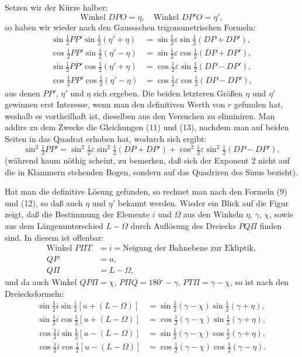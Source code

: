 \documentclass[12pt,a4paper]{article}
\newcommand{\degree}{\ensuremath{^\circ}}
\theoremstyle{plain}
\theoremstyle{definition}
\theoremstyle{remark}
\begin{document}
Setzen wir der Kürze halber:
\[
\text{Winkel }DPO = \eta,\quad \text{Winkel }DP'O = \eta',
\]
so haben wir wieder nach den Gaussschen trigonometrischen Formeln:
\begin{align}
\sin\tfrac{1}{2}PP' \sin\tfrac{1}{2}(\eta' + \eta) &= \sin\tfrac{1}{2}\varepsilon \sin\tfrac{1}{2}(DP + DP'), \tag{11}\\
\cos\tfrac{1}{2}PP' \sin\tfrac{1}{2}(\eta' - \eta) &= \sin\tfrac{1}{2}\varepsilon \cos\tfrac{1}{2}(DP + DP'), \tag{12}\\
\sin\tfrac{1}{2}PP' \cos\tfrac{1}{2}(\eta' + \eta) &= \cos\tfrac{1}{2}\varepsilon \sin\tfrac{1}{2}(DP - DP'), \tag{13}\\
\cos\tfrac{1}{2}PP' \cos\tfrac{1}{2}(\eta' - \eta) &= \cos\tfrac{1}{2}\varepsilon \cos\tfrac{1}{2}(DP - DP'), \tag{14}
\end{align}
aus denen $PP'$, $\eta'$ und $\eta$ sich ergeben. Die beiden letzteren Größen $\eta$ und $\eta'$ gewinnen erst Interesse, wenn man den definitiven Werth von $r$ gefunden hat, weshalb es vortheilhaft ist, dieselben aus den Versuchen zu eliminiren. Man addire zu dem Zwecke die Gleichungen (11) und (13), nachdem man auf beiden Seiten in das Quadrat erhoben hat, wodurch sich ergibt:
\begin{equation}
\sin^2\tfrac{1}{2}PP' = \sin^2\tfrac{1}{2}\varepsilon \sin^2\tfrac{1}{2}(DP + DP') + \cos^2\tfrac{1}{2}\varepsilon \sin^2\tfrac{1}{2}(DP - DP'), \tag{15}
\end{equation}
(während kaum nöthig scheint, zu bemerken, daß sich der Exponent 2 nicht auf die in Klammern stehenden Bogen, sondern auf das Quadriren des Sinus bezieht).

Hat man die definitive Lösung gefunden, so rechnet man nach den Formeln (9) und (12), so daß auch $\eta$ und $\eta'$ bekannt werden. Wieder ein Blick auf die Figur zeigt, daß die Bestimmung der Elemente $i$ und $\Omega$ aus den Winkeln $\eta$, $\gamma$, $\chi$, sowie aus dem Längenunterschied $L - \Omega$ durch Auflösung des Dreiecks $PQ\Pi$ finden sind. In diesem ist offenbar:
\begin{align*}
\text{Winkel }P\Pi T &= i = \text{Neigung der Bahnebene zur Ekliptik},\\
QP &= u,\\
Q\Pi &= L - \Omega,
\end{align*}
und da auch Winkel $QP\Pi = \chi$, $P\Pi Q = 180\degree - \gamma$, $PT\Pi = \gamma - \chi$, so ist nach den Dreiecksformeln:
\begin{align}
\sin\tfrac{1}{2}i \sin\tfrac{1}{2}[u + (L - \Omega)] &= \sin\tfrac{1}{2}(\gamma - \chi) \sin\tfrac{1}{2}(\gamma + \eta), \tag{16}\\
\sin\tfrac{1}{2}i \cos\tfrac{1}{2}[u + (L - \Omega)] &= \cos\tfrac{1}{2}(\gamma - \chi) \sin\tfrac{1}{2}(\gamma + \eta), \tag{17}\\
\cos\tfrac{1}{2}i \sin\tfrac{1}{2}[u - (L - \Omega)] &= \sin\tfrac{1}{2}(\gamma - \chi) \cos\tfrac{1}{2}(\gamma + \eta), \tag{18}\\
\cos\tfrac{1}{2}i \cos\tfrac{1}{2}[u - (L - \Omega)] &= \cos\tfrac{1}{2}(\gamma - \chi) \cos\tfrac{1}{2}(\gamma - \eta). \tag{19}
\end{align}
\end{document}
